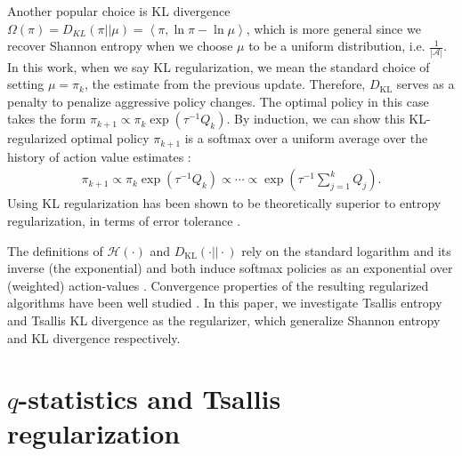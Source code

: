 \documentclass{article}
\newcommand{\AdaBracket}[1]{\left(#1\right)}
\newcommand{\AdaAngleProduct}[2]{\left\langle#1, #2\right\rangle}
\newcommand{\KLany}[2]{D_{\!K\!L}\!\left(#1 \left|  \right| #2 \right)}
\newcommand{\sumJK}[1]{\sum_{j=#1}^{k}}
\begin{document}
Another popular choice is KL divergence $\Omega(\pi)=\KLany{\pi}{\mu} = \AdaAngleProduct{\pi}{\ln{\pi} \!-\!\ln{\mu}}$, which is more general since we recover Shannon entropy when we choose $\mu$ to be a uniform distribution, i.e. $\frac{1}{|\mathcal{A}|}$. In this work, when we say KL regularization, we mean the standard choice of setting $\mu = \pi_k$, the estimate from the previous update.
Therefore, $D_\text{KL}$ serves as a penalty to penalize aggressive policy changes.
The optimal policy in this case takes the form $\pi_{k+1}\propto\pi_k\exp\AdaBracket{\tau^{-1} Q_k}$.
By induction, we can show this KL-regularized optimal policy $\pi_{k+1}$ is a softmax over a uniform average over the history of action value estimates \cite{vieillard2020leverage}:
\begin{align}
  \pi_{k+1} \propto \pi_k \exp\AdaBracket{\tau^{-1} Q_k}  \propto \cdots \propto \exp\AdaBracket{\! \tau^{-1}\sumJK{1}Q_j}
  .
  \label{eq:average}
\end{align}
Using KL regularization has been shown to be theoretically superior to entropy regularization, in terms of error tolerance \cite{azar2012dynamic,vieillard2020leverage,Kozuno-2022-KLGenerativeMinMaxOptimal,chan2021-greedification}.

The definitions of $\mathcal{H}(\cdot)$ and $D_\text{KL}(\cdot||\cdot)$ rely on the standard logarithm and its inverse (the exponential) and both induce softmax policies as an exponential over (weighted) action-values \citep{hiriart2004-convexanalysis,Nachum2020-RLFenchelRockafellar}. 
Convergence properties of the resulting regularized algorithms have been well studied \citep{kozunoCVI,geist19-regularized,vieillard2020leverage}.
In this paper, we investigate Tsallis entropy and Tsallis KL divergence as the regularizer, which generalize Shannon entropy and KL divergence respectively.



\section{$q$-statistics and Tsallis regularization}
\end{document}
